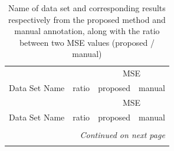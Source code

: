 \documentclass[letter]{bioinfo}
\begin{document}
\newpage



\begin{center}
\begin{longtable}{l ccc}

\caption{Name of data set and corresponding results respectively from the proposed method and manual annotation, along with the ratio between two MSE values (proposed / manual)} \label{t:peak_deconvolution} \\
 & & \multicolumn{2}{c}{MSE} \\
Data Set Name & ratio & \multicolumn{1}{c}{proposed} & manual \\\hline
\endfirsthead

 & & \multicolumn{2}{c}{MSE} \\
Data Set Name & ratio & \multicolumn{1}{c}{proposed} & manual \\\hline
\endhead

\\
\multicolumn{4}{r}{\textit{Continued on next page}} \\
\endfoot
\endlastfoot



\end{longtable}
\end{center}
\end{document}
